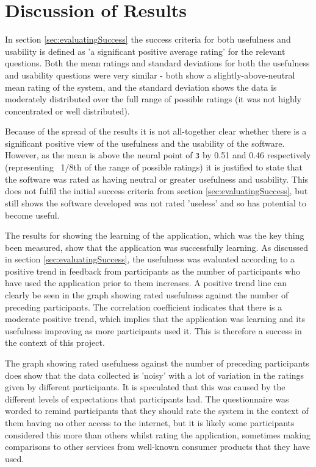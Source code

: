 \documentclass[authoryearcitations]{UoYCSproject}
\begin{document}
\section{Discussion of Results}
\label{sec:disResults}
In section \ref{sec:evaluatingSuccess} the success criteria for both usefulness and usability is defined as 'a significant positive average rating' for the relevant questions. Both the mean ratings and standard deviations for both the usefulness and usability questions were very similar - both show a slightly-above-neutral mean rating of the system, and the standard deviation shows the data is moderately distributed over the full range of possible ratings (it was not highly concentrated or well distributed).

Because of the spread of the results it is not all-together clear whether there is a significant positive view of the usefulness and the usability of the software. However, as the mean is above the neural point of \texttt{3} by 0.51 and 0.46 respectively (representing ~1/8th of the range of possible ratings) it is justified to state that the software was rated as having neutral or greater usefulness and usability. This does not fulfil the initial success criteria from section \ref{sec:evaluatingSuccess}, but still shows the software developed was not rated 'useless' and so has potential to become useful.


The results for showing the learning of the application, which was the key thing been measured, show that the application was successfully learning. As discussed in section \ref{sec:evaluatingSuccess}, the usefulness was evaluated according to a positive trend in feedback from participants as the number of participants who have used the application prior to them increases. A positive trend line can clearly be seen in the graph showing rated usefulness against the number of preceding participants. The correlation coefficient indicates that there is a moderate positive trend, which implies that the application was learning and its usefulness improving as more participants used it. This is therefore a success in the context of this project.

The graph showing rated usefulness against the number of preceding participants does show that the data collected is 'noisy' with a lot of variation in the ratings given by different participants. It is speculated that this was caused by the different levels of expectations that participants had. The questionnaire was worded to remind participants that they should rate the system in the context of them having no other access to the internet, but it is likely some participants considered this more than others whilst rating the application, sometimes making comparisons to other services from well-known consumer products that they have used.
\end{document}
